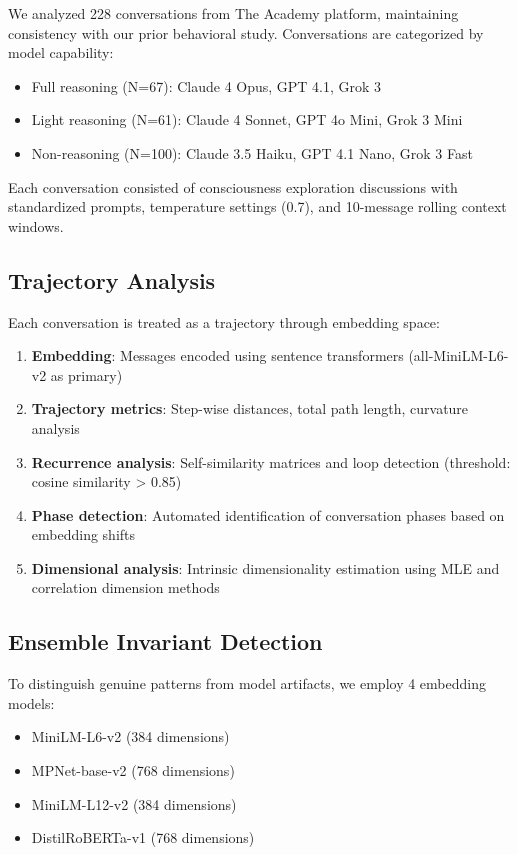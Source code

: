 \documentclass[11pt,letterpaper]{article}
\newcommand{\totalConversations}{228}
\newcommand{\fullReasoningN}{67}
\newcommand{\lightReasoningN}{61}
\newcommand{\nonReasoningN}{100}
\newcommand{\ensembleModels}{4}
\newcommand{\miniLMDim}{384}
\newcommand{\mpnetDim}{768}
\newcommand{\distilBertDim}{768}
\begin{document}
We analyzed \totalConversations{} conversations from The Academy platform, maintaining consistency with our prior behavioral study. Conversations are categorized by model capability:
\begin{itemize}
\item Full reasoning (N=\fullReasoningN{}): Claude 4 Opus, GPT 4.1, Grok 3
\item Light reasoning (N=\lightReasoningN{}): Claude 4 Sonnet, GPT 4o Mini, Grok 3 Mini
\item Non-reasoning (N=\nonReasoningN{}): Claude 3.5 Haiku, GPT 4.1 Nano, Grok 3 Fast
\end{itemize}

Each conversation consisted of consciousness exploration discussions with standardized prompts, temperature settings (0.7), and 10-message rolling context windows.

\subsection{Trajectory Analysis}

Each conversation is treated as a trajectory through embedding space:
\begin{enumerate}
\item \textbf{Embedding}: Messages encoded using sentence transformers (all-MiniLM-L6-v2 as primary)
\item \textbf{Trajectory metrics}: Step-wise distances, total path length, curvature analysis
\item \textbf{Recurrence analysis}: Self-similarity matrices and loop detection (threshold: cosine similarity > 0.85)
\item \textbf{Phase detection}: Automated identification of conversation phases based on embedding shifts
\item \textbf{Dimensional analysis}: Intrinsic dimensionality estimation using MLE and correlation dimension methods
\end{enumerate}

\subsection{Ensemble Invariant Detection}

To distinguish genuine patterns from model artifacts, we employ \ensembleModels{} embedding models:
\begin{itemize}
\item MiniLM-L6-v2 (\miniLMDim{} dimensions)
\item MPNet-base-v2 (\mpnetDim{} dimensions)
\item MiniLM-L12-v2 (\miniLMDim{} dimensions)
\item DistilRoBERTa-v1 (\distilBertDim{} dimensions)
\end{itemize}
\end{document}
